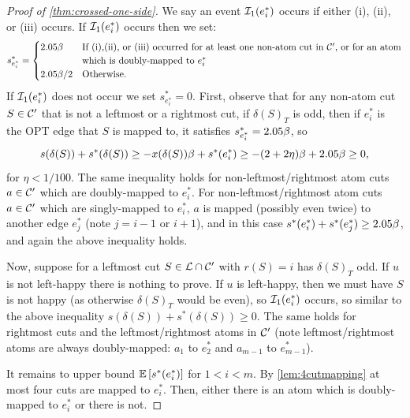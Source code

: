 \begin{proof}[Proof of \cref{thm:crossed-one-side}]
We say an event ${\cal I}_1(e^*_i)$ occurs if either (i), (ii), or (iii) occurs. If ${\cal I}_1(e^*_i)$ occurs then we set:
\begin{align*}
	s^*_{e^*_i} = \begin{cases}2.05\beta  & \text{If (i),(ii), or (iii) occurred for at least one non-atom cut in ${\cal C}'$, or for an atom}\\ &\text{which is doubly-mapped to $e^*_i$} \\
		2.05\beta/2 & \text{Otherwise.}
	 \end{cases}
\end{align*}
If ${\cal I}_1(e^*_i)$ does not occur we set $s^*_{e^*_i} = 0$. 
First, observe that for any non-atom cut $S\in {\cal C}'$  that is not a leftmost or a rightmost cut, 
if $\delta(S)_T$ is odd, then if $e^*_i$ is the OPT edge that $S$ is  mapped to, it satisfies $s^*_{e^*_i}=2.05\beta$, so
$$ s(\delta(S))+s^*(\delta(S))\geq -x(\delta(S))\beta + s^*(e^*_i)\geq -(2+2\eta)\beta+2.05\beta\geq 0,$$
for $\eta<1/100$.
The same inequality holds for non-leftmost/rightmost atom cuts $a\in {\cal C}'$ which are doubly-mapped to $e^*_i$. For non-leftmost/rightmost atom cuts $a\in {\cal C}'$ which are singly-mapped to $e^*_i$, $a$ is mapped (possibly even twice) to another edge $e^*_j$ (note $j=i-1$ or $i+1$), and in this case $s^*(e^*_i) + s^*(e^*_j) \ge 2.05\beta$, and again the above inequality holds.

Now, suppose for a leftmost cut $S\in{\cal L} \cap {\cal C}'$ with $r(S)=i$ has $\delta(S)_T$ odd. If $u$ is not left-happy there is nothing to prove. If $u$ is left-happy, then we must have $S$ is not happy (as otherwise $\delta(S)_T$ would be even), so ${\cal I}_1(e^*_i)$ occurs, so similar to the above inequality $s(\delta(S))+s^*(\delta(S))\geq 0$.
The same holds for rightmost cuts and the leftmost/rightmost atoms in ${\cal C}'$ (note leftmost/rightmost atoms are always doubly-mapped: $a_1$ to $e^*_2$ and $a_{m-1}$ to $e^*_{m-1}$).

It remains to upper bound ${\mathbb{E}}\left[s^*(e^*_i)\right]$ for $1<i<m$. By \cref{lem:4cutmapping} at most four cuts are mapped to $e^*_i$. Then, either there is an atom which is doubly-mapped to $e^*_i$ or there is not.


\end{proof}
